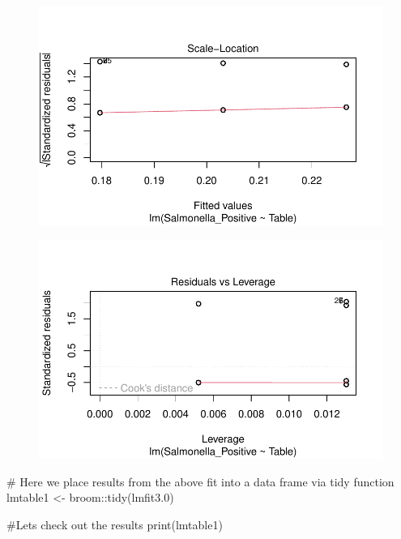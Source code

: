 \documentclass[
  letterpaper,
  DIV=11,
  numbers=noendperiod]{scrartcl}
\newenvironment{Shaded}{}{}
\newcommand{\CommentTok}[1]{\textcolor[rgb]{0.42,0.45,0.49}{#1}}
\newcommand{\FloatTok}[1]{\textcolor[rgb]{0.00,0.36,0.77}{#1}}
\newcommand{\FunctionTok}[1]{\textcolor[rgb]{0.44,0.26,0.76}{#1}}
\newcommand{\NormalTok}[1]{\textcolor[rgb]{0.14,0.16,0.18}{#1}}
\newcommand{\OtherTok}[1]{\textcolor[rgb]{0.44,0.26,0.76}{#1}}
\newcommand{\SpecialCharTok}[1]{\textcolor[rgb]{0.00,0.36,0.77}{#1}}
\begin{document}
\begin{figure}[H]

{\centering \includegraphics{Supplementary_Material_files/figure-pdf/unnamed-chunk-3-3.pdf}

}

\end{figure}

\begin{figure}[H]

{\centering \includegraphics{Supplementary_Material_files/figure-pdf/unnamed-chunk-3-4.pdf}

}

\end{figure}

\begin{Shaded}
\begin{Highlighting}[]
\CommentTok{\# Here we place results from the above fit into a data frame via tidy function}
\NormalTok{lmtable1 }\OtherTok{\textless{}{-}}\NormalTok{ broom}\SpecialCharTok{::}\FunctionTok{tidy}\NormalTok{(lmfit3}\FloatTok{.0}\NormalTok{)}

\CommentTok{\#Let\textquotesingle{}s check out the results}
\FunctionTok{print}\NormalTok{(lmtable1)}
\end{Highlighting}
\end{Shaded}
\end{document}
